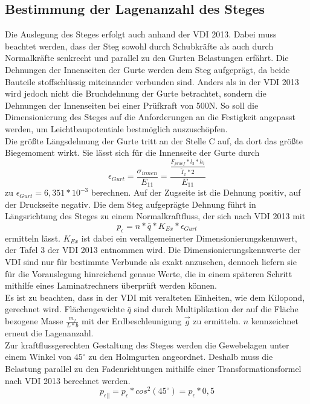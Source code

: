 \subsection{Bestimmung der Lagenanzahl des Steges}
Die Auslegung des Steges erfolgt auch anhand der VDI 2013. Dabei muss beachtet werden, dass der Steg sowohl durch Schubkräfte als auch durch Normalkräfte senkrecht und parallel zu den Gurten Belastungen erfährt. Die Dehnungen der Innenseiten der Gurte werden dem Steg aufgeprägt, da beide Bauteile stoffschlüssig miteinander verbunden sind. Anders als in der VDI 2013 wird jedoch nicht die Bruchdehnung der Gurte betrachtet, sondern die Dehnungen der Innenseiten bei einer Prüfkraft von 500N. So soll die Dimensionierung des Steges auf die Anforderungen an die Festigkeit angepasst werden, um Leichtbaupotentiale bestmöglich auszuschöpfen.\\

\noindent Die größte Längsdehnung der Gurte tritt an der Stelle C auf, da dort das größte Biegemoment wirkt. Sie lässt sich für die Innenseite der Gurte durch
\begin{equation}
	\epsilon_{Gurt}=\frac{\sigma_{innen}}{E_{11}}=\frac{\frac{F_{pruef}*l_{3}*h_{i}}{\tilde{I}_{x}*2}}{E_{11}}
\end{equation}  
 zu $ \epsilon_{Gurt}=6,351*10^{-3} $ berechnen. Auf der Zugseite ist die Dehnung positiv, auf der Druckseite negativ. Die dem Steg aufgeprägte Dehnung führt in Längsrichtung des Steges zu einem Normalkraftfluss, der sich nach VDI 2013 mit
 \begin{equation}
 	p_{\epsilon}=n*\bar{q}*K_{Ex}*\epsilon_{Gurt}
 \end{equation} 
ermitteln lässt. $ K_{Ex} $ ist dabei ein verallgemeinerter Dimensionierungskennwert, der Tafel 3 der VDI 2013 entnommen wird. Die Dimensionierungskennwerte der VDI sind nur für bestimmte Verbunde als exakt anzusehen, dennoch liefern sie für die Vorauslegung hinreichend genaue Werte, die in einem späteren Schritt mithilfe eines Laminatrechners überprüft werden können.\\

\noindent Es ist zu beachten, dass in der VDI mit veralteten Einheiten, wie dem Kilopond, gerechnet wird. Flächengewichte $ \bar{q} $ sind durch Multiplikation der auf die Fläche bezogene Masse $ \frac{m_{f}}{L*b} $ mit der Erdbeschleunigung $ \vec{g} $ zu ermitteln. $ n $ kennzeichnet erneut die Lagenanzahl.\\

\noindent Zur kraftflussgerechten Gestaltung des Steges werden die Gewebelagen unter einem Winkel von $ 45^{\circ} $ zu den Holmgurten angeordnet. Deshalb muss die Belastung parallel zu den Fadenrichtungen mithilfe einer Transformationsformel nach VDI 2013 berechnet werden.
\begin{equation}
	p_{\epsilon||}=p_{\epsilon}*cos^{2}\left(45^{\circ} \right)=p_{\epsilon}*0,5 
\end{equation}

